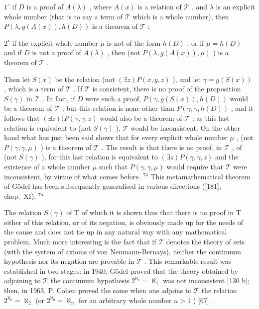 \(1^{\circ}\) if \(D\) is a proof of \(A(\lambda)\) , where \(A(x)\) is a relation of \(\mathcal{T}\) , and \(\lambda\) is an explicit whole number (that is to say a term of \(\mathcal{T}\) which is a whole number), then \(P(\lambda, g(A(x)), h(D))\) is a theorem of \(\mathcal{T}\) ;

\(2^{\circ}\) if the explicit whole number \(\mu\) is not of the form \(h(D)\) , or if \(\mu = h(D)\) and if \(D\) is not a proof of \(A(\lambda)\) , then (not \(P(\lambda, g(A(x)), \mu)\) ) is a theorem of \(\mathcal{T}\) .

Then let \(S(x)\) be the relation (not \((\exists z)P(x,y,z)\) ), and let \(\gamma = g(S(x))\) , which is a term of \(\mathcal{T}\) . If \(\mathcal{T}\) is consistent, there is no proof of the proposition \(S(\gamma)\) in \(\mathcal{T}\) . In fact, if \(D\) were such a proof, \(P(\gamma,g(S(x)),h(D))\) would be a theorem of \(\mathcal{T}\) ; but this relation is none other than \(P(\gamma,\gamma,h(D))\) , and it follows that \((\exists z)(P(\gamma,\gamma,z)\) would also be a theorem of \(\mathcal{T}\) ; as this last relation is equivalent to (not \(S(\gamma)\) ), \(\mathcal{T}\) would be inconsistent. On the other hand what has just been said shows that for every explicit whole number \(\mu\) , (not \(P(\gamma,\gamma,\mu)\) ) is a theorem of \(\mathcal{T}\) . The result is that there is no proof, in \(\mathcal{T}\) , of (not \(S(\gamma)\) ), for this last relation is equivalent to \((\exists z)P(\gamma,\gamma,z)\) and the existence of a whole number \(\mu\) such that \(P(\gamma,\gamma,\mu)\) would require that \(\mathcal{T}\) were inconsistent, by virtue of what comes before. \(^{74}\) This metamathematical theorem of Gödel has been subsequently generalised in various directions ({[}181{]}, chap.~XI). \(^{75}\)

The relation \(S(\gamma)\) of T of which it is shown thus that there is no proof in T either of this relation, or of its negation, is obviously made up for the needs of the cause and does not tie up in any natural way with any mathematical problem. Much more interesting is the fact that if \(\mathcal{T}\) denotes the theory of sets (with the system of axioms of von Neumann-Bernays), neither the continuum hypothesis nor its negation are provable in \(\mathcal{T}\) . This remarkable result was established in two stages: in 1940, Gödel proved that the theory obtained by adjoining to \(\mathcal{T}\) the continuum hypothesis \(2^{\aleph_0} = \aleph_1\) was not inconsistent {[}130 b{]}; then, in 1963, P. Cohen proved the same when one adjoins to \(\mathcal{T}\) the relation \(2^{\aleph_0} = \aleph_2\) (or \(2^{\aleph_0} = \aleph_n\) for an arbitrary whole number \(n > 1\) ) {[}67{]}.

